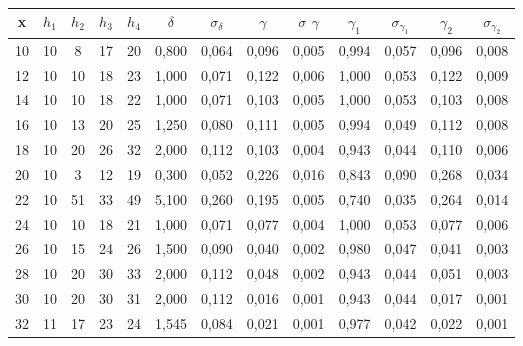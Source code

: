 \documentclass[a4paper,12pt]{article}
\begin{document}
\begin{table}[h!]
\label{table:gamma_2}
\caption{}
\begin{center}
\begin{tabular}{|c|c|c|c|c|c|c|c|c|c|c|c|c|}
\hline
x  & $h_1$ & $h_2$ & $h_3$ & $h_4$ & $\delta$ & $\sigma_{\delta}$ & $\gamma$ & $\sigma$ $\gamma$ & $\gamma_1$ & $\sigma_{\gamma_1}$ & $\gamma_2$ & $\sigma_{\gamma_2}$ \\ \hline
10 & 10   & 8    & 17   & 20   & 0,800 & 0,064       & 0,096 & 0,005       & 0,994    & 0,057          & 0,096    & 0,008          \\ \hline
12 & 10   & 10   & 18   & 23   & 1,000 & 0,071       & 0,122 & 0,006       & 1,000    & 0,053          & 0,122    & 0,009          \\ \hline
14 & 10   & 10   & 18   & 22   & 1,000 & 0,071       & 0,103 & 0,005       & 1,000    & 0,053          & 0,103    & 0,008          \\ \hline
16 & 10   & 13   & 20   & 25   & 1,250 & 0,080       & 0,111 & 0,005       & 0,994    & 0,049          & 0,112    & 0,008          \\ \hline
18 & 10   & 20   & 26   & 32   & 2,000 & 0,112       & 0,103 & 0,004       & 0,943    & 0,044          & 0,110    & 0,006          \\ \hline
20 & 10   & 3    & 12   & 19   & 0,300 & 0,052       & 0,226 & 0,016       & 0,843    & 0,090          & 0,268    & 0,034          \\ \hline
22 & 10   & 51   & 33   & 49   & 5,100 & 0,260       & 0,195 & 0,005       & 0,740    & 0,035          & 0,264    & 0,014          \\ \hline
24 & 10   & 10   & 18   & 21   & 1,000 & 0,071       & 0,077 & 0,004       & 1,000    & 0,053          & 0,077    & 0,006          \\ \hline
26 & 10   & 15   & 24   & 26   & 1,500 & 0,090       & 0,040 & 0,002       & 0,980    & 0,047          & 0,041    & 0,003          \\ \hline
28 & 10   & 20   & 30   & 33   & 2,000 & 0,112       & 0,048 & 0,002       & 0,943    & 0,044          & 0,051    & 0,003          \\ \hline
30 & 10   & 20   & 30   & 31   & 2,000 & 0,112       & 0,016 & 0,001       & 0,943    & 0,044          & 0,017    & 0,001          \\ \hline
32 & 11   & 17   & 23   & 24   & 1,545 & 0,084       & 0,021 & 0,001       & 0,977    & 0,042          & 0,022    & 0,001          \\ \hline

\end{tabular}
\end{center}
\end{table}
\end{document}
